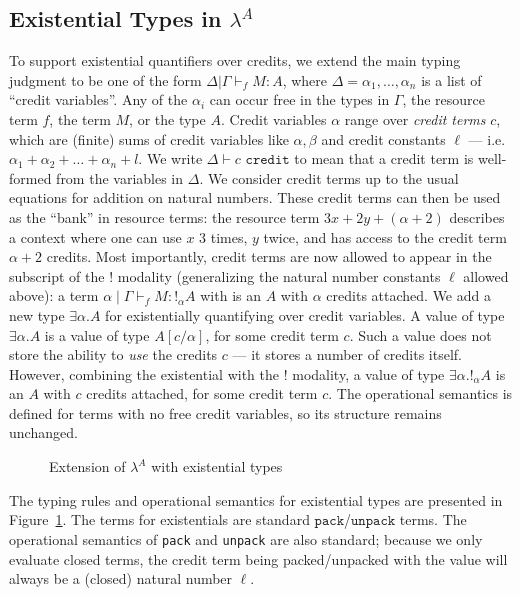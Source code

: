 \subsection{Existential Types in $\lambda^A$}
To support existential quantifiers over credits, we extend the main typing judgment to be one of the form $\Delta | \Gamma \vdash_f M : A$, where $\Delta = \alpha_1,\dots,\alpha_n$ is a list of ``credit variables''. Any of the $\alpha_i$ can occur free in the types in $\Gamma$, the resource term $f$, the term $M$, or the type $A$. Credit variables $\alpha$ range over \textit{credit terms} $c$, which are (finite) sums of credit variables like $\alpha,\beta$ and credit constants $\ell$ --- i.e. $\alpha_1 + \alpha_2 + \ldots + \alpha_n + l$.  We write $\Delta \vdash c \texttt{  credit}$ to mean that a credit term is well-formed from the variables in $\Delta$.  We consider credit terms up to the usual equations for addition on natural numbers.  These credit terms can then be used as the ``bank'' in resource terms: the resource term $3x + 2y + (\alpha + 2)$ describes a context where one can use $x$ $3$ times, $y$ twice, and has access to the credit term $\alpha + 2$ credits. Most importantly, credit terms are now allowed to appear in the subscript of the $!$ modality (generalizing the natural number constants $\ell$ allowed above): a term $\alpha \mid \Gamma \vdash_f M : !_\alpha A$ with is an $A$ with $\alpha$ credits attached.
We add a new type $\exists \alpha . A$ for existentially quantifying over credit variables.
A value of type $\exists \alpha . A$ is a value of type $A[c/\alpha]$, for some credit term $c$.  Such a value does not store the ability to \emph{use} the credits $c$ --- it stores a number of credits itself.
However, combining the existential with the $!$ modality,
a value of type $\exists \alpha. !_\alpha A$ is an $A$ with $c$ credits attached, for some credit term $c$.
The operational semantics is defined for terms with no free credit variables, so its structure remains unchanged.

\begin{figure}
  
  \caption{Extension of $\lambda^A$ with existential types}
  \label{fig:la-ex-rules}
\end{figure}

The typing rules and operational semantics for existential types are presented in Figure~\ref{fig:la-ex-rules}.
The terms for existentials are standard $\texttt{pack}$/$\texttt{unpack}$ terms.
The operational semantics of \texttt{pack} and \texttt{unpack} are also standard; because we only evaluate closed terms, the credit term being packed/unpacked with the value will always be a (closed) natural number $\ell$.

